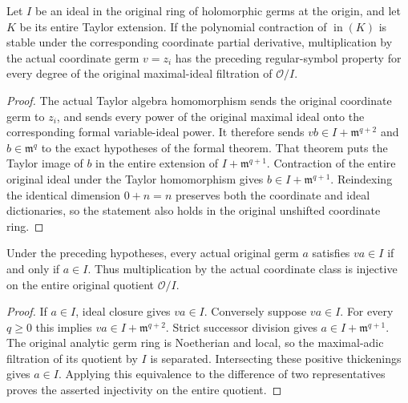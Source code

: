 \begin{theorem}
\label{hir:actual-initial-tangent-original-regular-symbol}
\leanok
Let $I$ be an ideal in the original ring of holomorphic germs at the
origin, and let $K$ be its entire Taylor extension. If the polynomial
contraction of $\operatorname{in}(K)$ is stable under the corresponding
coordinate partial derivative, multiplication by the actual coordinate
germ $v=z_i$ has the preceding regular-symbol property for every degree
of the original maximal-ideal filtration of $\mathcal O/I$.
\end{theorem}
\begin{proof}
The actual Taylor algebra homomorphism sends the original coordinate
germ to $z_i$, and sends every power of the original maximal ideal
onto the corresponding formal variable-ideal power. It therefore sends
$vb\in I+\mathfrak m^{q+2}$ and $b\in\mathfrak m^q$ to the exact
hypotheses of the formal theorem. That theorem puts the Taylor image of
$b$ in the entire extension of $I+\mathfrak m^{q+1}$.
Contraction of the entire original ideal under the Taylor homomorphism
gives $b\in I+\mathfrak m^{q+1}$. Reindexing the identical dimension
$0+n=n$ preserves both the coordinate and ideal dictionaries, so the
statement also holds in the original unshifted coordinate ring.
\end{proof}

\begin{theorem}
\label{hir:actual-initial-tangent-original-coordinate-saturation}
\leanok
Under the preceding hypotheses, every actual original germ $a$ satisfies
$va\in I$ if and only if $a\in I$. Thus multiplication by the actual
coordinate class is injective on the entire original quotient
$\mathcal O/I$.
\end{theorem}
\begin{proof}
If $a\in I$, ideal closure gives $va\in I$. Conversely suppose
$va\in I$. For every $q\geq0$ this implies
$va\in I+\mathfrak m^{q+2}$. Strict successor division gives
$a\in I+\mathfrak m^{q+1}$. The original analytic germ ring is
Noetherian and local, so the maximal-adic filtration of its quotient
by $I$ is separated. Intersecting these positive thickenings gives
$a\in I$. Applying this equivalence to the difference of two
representatives proves the asserted injectivity on the entire
quotient.
\end{proof}

